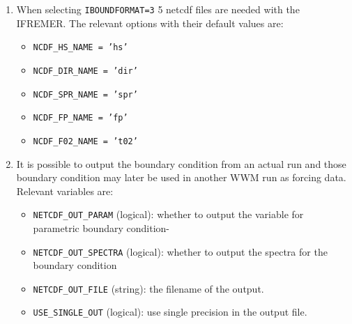 \documentclass[12pt]{amsart}
\begin{document}
\begin{enumerate}
\item When selecting {\tt IBOUNDFORMAT=3} 5 netcdf files are needed with the IFREMER. The relevant options with their default values are:
  \begin{itemize}
  \item {\tt NCDF\_HS\_NAME = 'hs'}
  \item {\tt NCDF\_DIR\_NAME  = 'dir'}
  \item {\tt NCDF\_SPR\_NAME  = 'spr'}
  \item {\tt NCDF\_FP\_NAME   = 'fp'}
  \item {\tt NCDF\_F02\_NAME  = 't02'}
  \end{itemize}
\item It is possible to output the boundary condition from an actual run and those boundary condition may later be used in another WWM run as forcing data. Relevant variables are:
  \begin{itemize}
  \item {\tt NETCDF\_OUT\_PARAM} (logical): whether to output the variable for parametric boundary condition-
  \item {\tt NETCDF\_OUT\_SPECTRA} (logical): whether to output the spectra for the boundary condition
  \item {\tt NETCDF\_OUT\_FILE} (string): the filename of the output.
  \item {\tt USE\_SINGLE\_OUT} (logical): use single precision in the output file.
  \end{itemize}
  
  

\end{enumerate}
\end{document}
